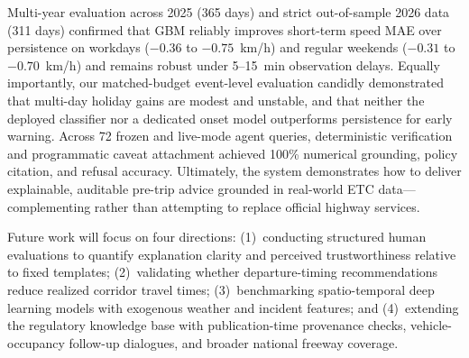 \documentclass[conference]{IEEEtran}
\begin{document}
Multi-year evaluation across 2025 (365 days) and strict out-of-sample 2026 data (311 days) confirmed that GBM reliably improves short-term speed MAE over persistence on workdays ($-0.36$ to $-0.75$~km/h) and regular weekends ($-0.31$ to $-0.70$~km/h) and remains robust under 5--15~min observation delays. Equally importantly, our matched-budget event-level evaluation candidly demonstrated that multi-day holiday gains are modest and unstable, and that neither the deployed classifier nor a dedicated onset model outperforms persistence for early warning. Across 72 frozen and live-mode agent queries, deterministic verification and programmatic caveat attachment achieved 100\% numerical grounding, policy citation, and refusal accuracy. Ultimately, the system demonstrates how to deliver explainable, auditable pre-trip advice grounded in real-world ETC data---complementing rather than attempting to replace official highway services.

Future work will focus on four directions: (1)~conducting structured human evaluations to quantify explanation clarity and perceived trustworthiness relative to fixed templates; (2)~validating whether departure-timing recommendations reduce realized corridor travel times; (3)~benchmarking spatio-temporal deep learning models with exogenous weather and incident features; and (4)~extending the regulatory knowledge base with publication-time provenance checks, vehicle-occupancy follow-up dialogues, and broader national freeway coverage.
\end{document}

